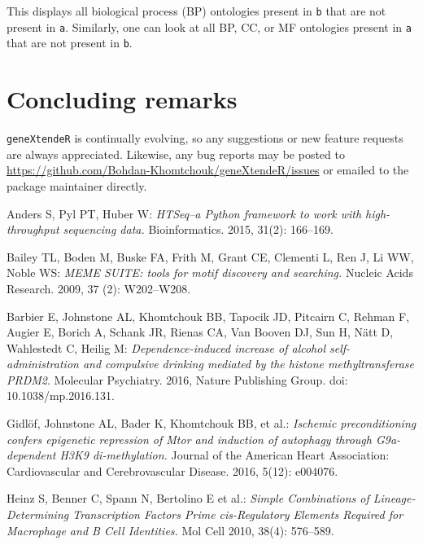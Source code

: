 \documentclass[12pt]{article}
\begin{document}
This displays all biological process (BP) ontologies present in \texttt{b} that are not present in \texttt{a}.  Similarly, one can look at all BP, CC, or MF ontologies present in \texttt{a} that are not present in \texttt{b}. 

\section{Concluding remarks}

\texttt{geneXtendeR} is continually evolving, so any suggestions or new feature requests are always appreciated.  Likewise, any bug reports may be posted to \url{https://github.com/Bohdan-Khomtchouk/geneXtendeR/issues} or emailed to the package maintainer directly.    


\begin{thebibliography}{31}

Anders S, Pyl PT, Huber W:  \textit{HTSeq--a Python framework to work with high-throughput sequencing data.}  Bioinformatics.  2015, 31(2): 166--169. 

Bailey TL, Boden M, Buske FA, Frith M, Grant CE, Clementi L, Ren J, Li WW, Noble WS:  \textit{MEME SUITE: tools for motif discovery and searching.}  Nucleic Acids Research.  2009, 37 (2): W202--W208. 

Barbier E, Johnstone AL, Khomtchouk BB, Tapocik JD, Pitcairn C, Rehman F, Augier E, Borich A, Schank JR, Rienas CA, Van Booven DJ, Sun H, N\"{a}tt D, Wahlestedt C, Heilig M: \textit{Dependence-induced increase of alcohol self-administration and compulsive drinking mediated by the histone methyltransferase PRDM2}.  Molecular Psychiatry. 2016, Nature Publishing Group. doi: 10.1038/mp.2016.131.

Gidl\"{o}f, Johnstone AL, Bader K, Khomtchouk BB, et al.: \textit{Ischemic preconditioning confers epigenetic repression of Mtor and induction of autophagy through G9a-dependent H3K9 di-methylation.} Journal of the American Heart Association: Cardiovascular and Cerebrovascular Disease. 2016, 5(12): e004076.

Heinz S, Benner C, Spann N, Bertolino E et al.: \textit{Simple Combinations of Lineage-Determining Transcription Factors Prime cis-Regulatory Elements Required for Macrophage and B Cell Identities.} Mol Cell 2010, 38(4): 576--589.



\end{thebibliography}
\end{document}
